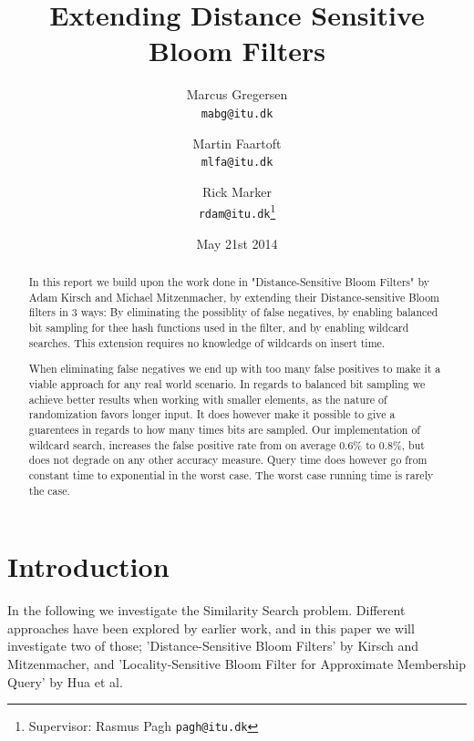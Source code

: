 \documentclass[a4paper,11pt]{article}
\begin{document}
\graphicspath{ {./images/} }
\date{May 21st 2014}
\title{Extending Distance Sensitive Bloom Filters}

\author{Marcus Gregersen\\
\texttt{mabg@itu.dk}
\and Martin Faartoft\\
\texttt{mlfa@itu.dk}
\and Rick Marker\\
\texttt{rdam@itu.dk}\thanks{Supervisor: Rasmus Pagh \texttt{pagh@itu.dk}}}
\clearpage\maketitle
\thispagestyle{empty}
\setcounter{page}{1}
\begin{abstract}
In this report we build upon the work done in "Distance-Sensitive Bloom Filters" by Adam Kirsch and Michael Mitzenmacher, by extending their Distance-sensitive Bloom filters in 3 ways:
By eliminating the possiblity of false negatives, by enabling balanced bit sampling for thee hash functions used in the filter, and by enabling wildcard searches. This extension requires no knowledge of wildcards on insert time.

When eliminating false negatives we end up with too many false positives to make it a viable approach for any real world scenario.
In regards to balanced bit sampling we achieve better results when working with smaller elements, as the nature of randomization favors longer input. It does however make it possible to give a guarentees in regards to how many times bits are sampled.
Our implementation of wildcard search, increases the false positive rate from on average 0.6\% to 0.8\%, but does not degrade on any other accuracy measure. Query time does however go from constant time to exponential in the worst case. The worst case running time is rarely the case.
\end{abstract}

\newpage
\setcounter{page}{1}

\section{Introduction}
In the following we investigate the Similarity Search problem. Different approaches have been explored by earlier work, and in this paper we will investigate two of those; 'Distance-Sensitive Bloom Filters'\cite{paper:harvard} by Kirsch and Mitzenmacher, and 'Locality-Sensitive Bloom Filter for Approximate Membership Query'\cite{paper:hua} by Hua et al.
\end{document}
